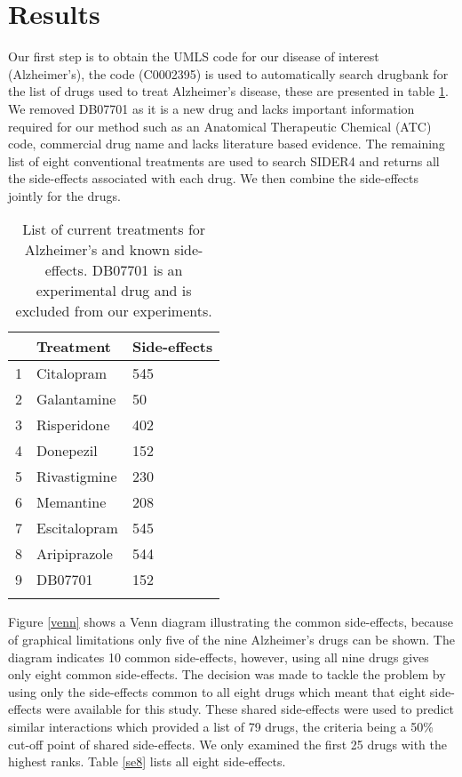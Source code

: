\documentclass[preprint,11pt]{elsarticle}
\begin{document}
\section{Results}
Our first step is to obtain the UMLS code for our disease of interest (Alzheimer's), the code (C0002395) is used to automatically search drugbank for the list of drugs used to treat Alzheimer's disease, these are presented in table \ref{drugs}. We removed DB07701 as it is a new drug and  lacks important information required for our method such as an Anatomical Therapeutic Chemical (ATC) code, commercial drug name and lacks literature based evidence. The remaining list of eight conventional treatments are used to search SIDER4 and returns all the side-effects associated with each drug. We then combine the side-effects jointly for the drugs. 

\begin{table}[h]
\scriptsize
\centering \caption{List of current treatments for Alzheimer's and known side-effects. DB07701 is an experimental drug and is excluded from our experiments.}
\begin{tabular}{lll}
  \hline
\textbf{} & \textbf{Treatment} & \textbf{Side-effects} \\ \hline
1 & Citalopram &545 \\
2 & Galantamine &50 \\
3 & Risperidone& 402 \\
4 & Donepezil & 152 \\
5 & Rivastigmine & 230 \\
6 & Memantine & 208 \\
7 & Escitalopram & 545 \\
8 & Aripiprazole &544 \\
9 & DB07701 &152 \\
   \hline \\
   \end{tabular}
\label{drugs}
\end{table}
\normalsize


Figure \ref{venn} shows a Venn diagram illustrating the common side-effects, because of graphical limitations only five of the nine Alzheimer's drugs can be shown. The diagram indicates 10 common side-effects, however, using all nine drugs gives only eight common side-effects. The decision was made to tackle the problem by using only the side-effects common to all eight drugs which meant that eight side-effects were available for this study. These shared side-effects were used to predict similar interactions which provided a list of 79 drugs, the criteria being a 50\% cut-off point of shared side-effects. We only examined the first 25 drugs with the highest ranks.   Table \ref{se8} lists all eight side-effects.
\end{document}
